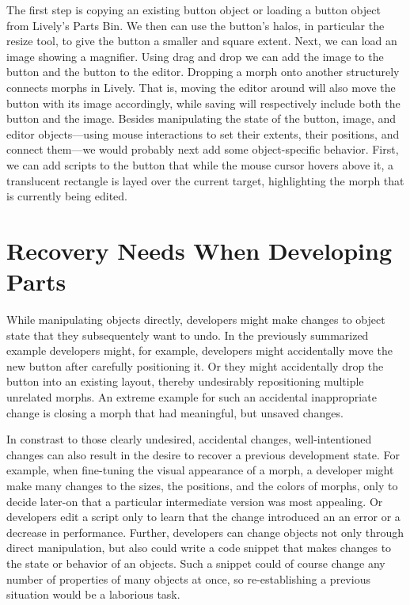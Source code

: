 The first step is copying an existing button object or loading a button object from Lively's Parts Bin.
We then can use the button's halos, in particular the resize tool, to give the button a smaller and square extent.
Next, we can load an image showing a magnifier.
Using drag and drop we can add the image to the button and the button to the editor.
Dropping a morph onto another structurely connects morphs in Lively.
That is, moving the editor around will also move the button with its image accordingly, while saving will respectively include both the button and the image.
Besides manipulating the state of the button, image, and editor objects---using mouse interactions to set their extents, their positions, and connect them---we would probably next add some object-specific behavior.
First, we can add scripts to the button that while the mouse cursor hovers above it, a translucent rectangle is layed over the current target, highlighting the morph that is currently being edited.



\section{Recovery Needs When Developing Parts}


While manipulating objects directly, developers might make changes to object state that they subsequentely want to undo.
In the previously summarized example developers might, for example, developers might accidentally move the new button after carefully positioning it.
Or they might accidentally drop the button into an existing layout, thereby undesirably repositioning multiple unrelated morphs.
An extreme example for such an accidental inappropriate change is closing a morph that had meaningful, but unsaved changes.

In constrast to those clearly undesired, accidental changes, well-intentioned changes can also result in the desire to recover a previous development state.
For example, when fine-tuning the visual appearance of a morph, a developer might make many changes to the sizes, the positions, and the colors of morphs, only to decide later-on that a particular intermediate version was most appealing.
Or developers edit a script only to learn that the change introduced an an error or a decrease in performance.
Further, developers can change objects not only through direct manipulation, but also could write a code snippet that makes changes to the state or behavior of an objects.
Such a snippet could of course change any number of properties of many objects at once, so re-establishing a previous situation would be a laborious task.

